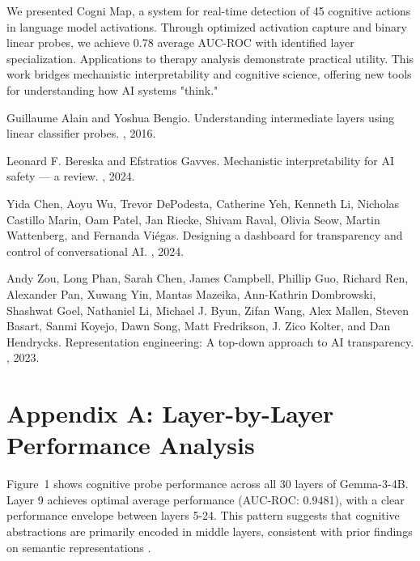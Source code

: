 \documentclass[letterpaper]{article}
\begin{document}
We presented Cogni Map, a system for real-time detection of 45 cognitive actions in language model activations. Through optimized activation capture and binary linear probes, we achieve 0.78 average AUC-ROC with identified layer specialization. Applications to therapy analysis demonstrate practical utility. This work bridges mechanistic interpretability and cognitive science, offering new tools for understanding how AI systems "think."


\begin{thebibliography}{9}

Guillaume Alain and Yoshua Bengio.
\newblock Understanding intermediate layers using linear classifier probes.
, 2016.

Leonard F. Bereska and Efstratios Gavves.
\newblock Mechanistic interpretability for AI safety --- a review.
, 2024.

Yida Chen, Aoyu Wu, Trevor DePodesta, Catherine Yeh, Kenneth Li, Nicholas Castillo Marin, Oam Patel, Jan Riecke, Shivam Raval, Olivia Seow, Martin Wattenberg, and Fernanda Viégas.
\newblock Designing a dashboard for transparency and control of conversational AI.
, 2024.

Andy Zou, Long Phan, Sarah Chen, James Campbell, Phillip Guo, Richard Ren, Alexander Pan, Xuwang Yin, Mantas Mazeika, Ann-Kathrin Dombrowski, Shashwat Goel, Nathaniel Li, Michael J. Byun, Zifan Wang, Alex Mallen, Steven Basart, Sanmi Koyejo, Dawn Song, Matt Fredrikson, J. Zico Kolter, and Dan Hendrycks.
\newblock Representation engineering: A top-down approach to AI transparency.
, 2023.

\end{thebibliography}

\appendix

\section{Appendix A: Layer-by-Layer Performance Analysis}

Figure~1 shows cognitive probe performance across all 30 layers of Gemma-3-4B. Layer 9 achieves optimal average performance (AUC-ROC: 0.9481), with a clear performance envelope between layers 5-24. This pattern suggests that cognitive abstractions are primarily encoded in middle layers, consistent with prior findings on semantic representations \cite{alain2016understanding}.
\end{document}
